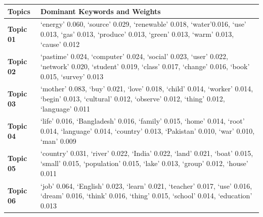 \documentclass[sn-mathphys,Numbered]{sn-jnl}%
\theoremstyle{thmstyleone}%
\theoremstyle{thmstyletwo}%
\theoremstyle{thmstylethree}%
\begin{document}
\begin{longtable}[]{@{}
  >{\raggedright\arraybackslash}p{}     
  >{\raggedright\arraybackslash}p{}@{}}
\toprule
Topics & Dominant Keywords and Weights \\
\midrule
\endhead
\textbf{Topic 01} & \enquote*{energy} 0.060, \enquote*{source} 0.029, \enquote*{renewable} 0.018, \enquote*{water}0.016, \enquote*{use} 0.013, \enquote*{gas} 0.013, \enquote*{produce} 0.013, \enquote*{green} 0.013, \enquote*{warm}
0.013, \enquote*{cause} 0.012 
\\
\textbf{Topic 02} & \enquote*{pastime} 0.024, \enquote*{computer} 0.024, \enquote*{social} 0.023, \enquote*{user} 0.022, \enquote*{network} 0.020, \enquote*{student} 0.019, \enquote*{class} 0.017, \enquote*{change} 0.016, \enquote*{book} 0.015, \enquote*{survey} 0.013  
\\
\textbf{Topic 03 }& \enquote*{mother} 0.083, \enquote*{buy} 0.021, \enquote*{love} 0.018, \enquote*{child} 0.014, \enquote*{worker} 0.014, \enquote*{begin} 0.013, \enquote*{cultural} 0.012, \enquote*{observe} 0.012, \enquote*{thing} 0.012, \enquote*{language} 0.011 
\\ 
\textbf{Topic 04} &  \enquote*{life} 0.016, \enquote*{Bangladesh} 0.016, \enquote*{family} 0.015, \enquote*{home} 0.014, \enquote*{root} 0.014, \enquote*{language} 0.014, \enquote*{country} 0.013, \enquote*{Pakistan} 0.010, \enquote*{war} 0.010, \enquote*{man} 0.009 
\\ 
\textbf{Topic 05} & \enquote*{country} 0.031, \enquote*{river} 0.022, \enquote*{India} 0.022, \enquote*{land} 0.021, \enquote*{boat} 0.015, \enquote*{small} 0.015, \enquote*{population} 0.015, \enquote*{lake} 0.013, \enquote*{group} 0.012, \enquote*{house} 0.011 
\\ 
\textbf{Topic 06} & \enquote*{job} 0.064, \enquote*{English} 0.023, \enquote*{learn} 0.021, \enquote*{teacher} 0.017, \enquote*{use} 0.016, \enquote*{dream} 0.016, \enquote*{think} 0.016, \enquote*{thing} 0.015, \enquote*{school} 0.014, \enquote*{education} 0.013\\
\bottomrule
\end{longtable}




\end{document}
